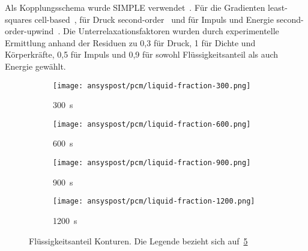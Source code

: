 Als Kopplungsschema wurde SIMPLE verwendet~\cite{akamcae-udf}. Für die Gradienten least-squares cell-based~\cite{akamcae-udf}, für Druck second-order~\cite{akamcae-udf} und für Impuls und Energie
second-order-upwind~\cite{akamcae-udf}. Die Unterrelaxationsfaktoren wurden durch experimentelle Ermittlung anhand der Residuen zu 0,3 für Druck, 1 für Dichte
und Körperkräfte, 0,5 für Impuls und 0,9 für sowohl Flüssigkeitsanteil als auch Energie gewählt.

\begin{figure}
    \centering

    \begin{minipage}[t]{0.485\textwidth}
        \centering
        \setlength{\tabcolsep}{1pt} %
        \begin{subfigure}[t]{0.16\textwidth}
            \centering
        \end{subfigure}%
        \hspace{2mm}%
        \begin{subfigure}[t]{0.2\textwidth}
            \centering
            \texttt{[image: ansyspost/pcm/liquid-fraction-300.png]}
            \caption{\SI{300}{\second}}\label{fig:liquid_fraction_300}
        \end{subfigure}%
        \begin{subfigure}[t]{0.2\textwidth}
            \centering
            \texttt{[image: ansyspost/pcm/liquid-fraction-600.png]}
            \caption{\SI{600}{\second}}\label{fig:liquid_fraction_600}
        \end{subfigure}%
        \begin{subfigure}[t]{0.2\textwidth}
            \centering
            \texttt{[image: ansyspost/pcm/liquid-fraction-900.png]}
            \caption{\SI{900}{\second}}\label{fig:liquid_fraction_900}
        \end{subfigure}%
        \begin{subfigure}[t]{0.2\textwidth}
            \centering
            \texttt{[image: ansyspost/pcm/liquid-fraction-1200.png]}
            \caption{\SI{1200}{\second}}\label{fig:liquid_fraction_1200}
        \end{subfigure}
        \caption{Flüssigkeitsanteil Konturen. Die Legende bezieht sich auf~\ref{fig:liquid_fraction_1200}}

\end{minipage}
\end{figure}
